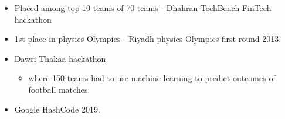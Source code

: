\smallskip
\begin{itemize}
    \item Placed among top 10 teams of 70 teams - Dhahran TechBench FinTech hackathon
          \smallskip
    \item 1st place in physics Olympics - Riyadh physics Olympics first round 2013.
\end{itemize}

\smallskip
\begin{itemize}
    \item Dawri Thakaa hackathon
          \begin{itemize}
              \item where 150 teams had to use machine learning to predict outcomes of football matches.
          \end{itemize}
    \item Google HashCode 2019.
\end{itemize}


